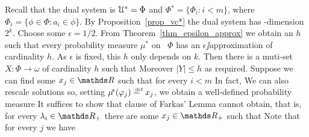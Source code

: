 \documentclass[combinatorics.tex]{subfiles}
\begin{document}
Recall that the dual system is $\EuScript U^*=\Phi$ and $\Phi\!^{*}\!=\big\{\Phi_i: i<m\big\}$, where $\Phi_i=\big\{\phi\in\Phi: a_i\in\phi\big\}$.
By Proposition~\ref{prop_vc*} the dual system has \vc-dimension $2^k$.
Choose some $\epsilon=1/2$.
From Theorem~\ref{thm_epsilon_approx} we obtain an $h$ such that every probability measure $\mu^*\!$ on \ $\Phi$ has an $\epsilon\jj$ap\-prox\-i\-ma\-tion of cardinality $h$.
As $\epsilon$ is fixed, this $h$ only depends on $k$.
Then there is a muti-set $X:\Phi\to\omega$ of cardinality $h$ such that
% 
% 
% 
% 
Moreover $|Y|\le h$ as required.
% 
Suppose we can find some $x_j\in\RR$ such that for every $i<m$
% 
% 
In fact,
% 
% 
We can also rescale solutions so, setting $\mu\!^*(\phi_j)\deq x_j$, we obtain a well-defined probability measure
% 
% 
It suffices to show that clause  of Farkas' Lemma cannot obtain, that is, for every $\lambda_i\in\RR_+$ there are some $x_j\in\RR_+$ such that
% 
% 
Note that for every $j$ we have
% 
% 
\end{document}
